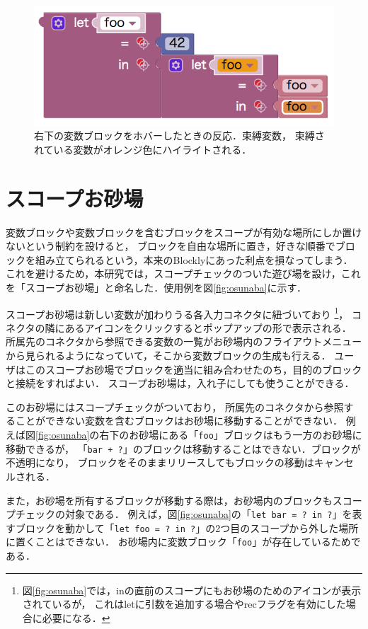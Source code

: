 \begin{figure}[h]
 \includegraphics[keepaspectratio, scale=0.3]{img/dupFooInt42.png}
 \caption{右下の変数ブロックをホバーしたときの反応．束縛変数，
束縛されている変数がオレンジ色にハイライトされる．\label{fig:dupFooHover}}
\end{figure}

\section {スコープお砂場}
変数ブロックや変数ブロックを含むブロックをスコープが有効な場所にしか置けないという制約を設けると，
ブロックを自由な場所に置き，好きな順番でブロックを組み立てられるという，本来のBlocklyにあった利点を損なってしまう．
これを避けるため，本研究では，スコープチェックのついた遊び場を設け，これを「スコープお砂場」と命名した．使用例を図\ref{fig:osunaba}に示す．

スコープお砂場は新しい変数が加わりうる各入力コネクタに紐づいており
\footnote{図\ref{fig:osunaba}では，inの直前のスコープにもお砂場のためのアイコンが表示されているが，
これはletに引数を追加する場合やrecフラグを有効にした場合に必要になる．}，
コネクタの隣にあるアイコンをクリックするとポップアップの形で表示される．
所属先のコネクタから参照できる変数の一覧がお砂場内のフライアウトメニューから見られるようになっていて，そこから変数ブロックの生成も行える．
ユーザはこのスコープお砂場でブロックを適当に組み合わせたのち，目的のブロックと接続をすればよい．
スコープお砂場は，入れ子にしても使うことができる．

このお砂場にはスコープチェックがついており，
所属先のコネクタから参照することができない変数を含むブロックはお砂場に移動することができない．
例えば図\ref{fig:osunaba}の右下のお砂場にある「{\tt foo}」ブロックはもう一方のお砂場に移動できるが，
「{\tt bar + ?}」のブロックは移動することはできない．ブロックが不透明になり，
ブロックをそのままリリースしてもブロックの移動はキャンセルされる．

また，お砂場を所有するブロックが移動する際は，お砂場内のブロックもスコープチェックの対象である．
例えば，図\ref{fig:osunaba}の「{\tt let bar = ?\ in ?}」を表すブロックを動かして「{\tt let foo = ?\ in ?}」の2つ目のスコープから外した場所に置くことはできない．
お砂場内に変数ブロック「{\tt foo}」が存在しているためである．

